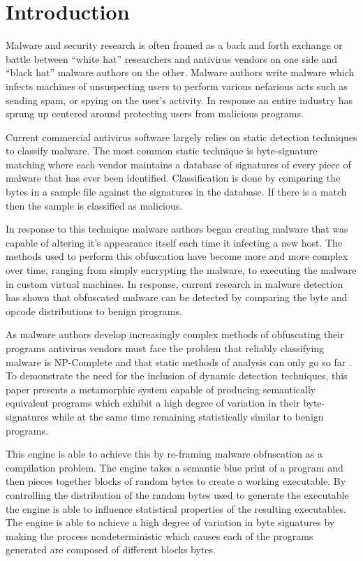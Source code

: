 \chapter{Introduction}

    Malware and security research is often framed as a back and forth exchange
    or battle between ``white hat'' researchers and antivirus vendors on one
    side and ``black hat'' malware authors on the other. Malware authors write
    malware which infects machines of unsuspecting users to perform various
    nefarious acts such as sending spam, or spying on the user's activity. In
    response an entire industry has sprung up centered around protecting users
    from malicious programs.

    Current commercial antivirus software largely relies on static detection
    techniques to classify malware. The most common static technique is
    byte-signature matching where each vendor maintains a database of signatures
    of every piece of malware that has ever been identified. Classification is
    done by comparing the bytes in a sample file against the signatures in the
    database. If there is a match then the sample is classified as malicious.

    In response to this technique malware authors began creating malware that
    was capable of altering it's appearance itself each time it infecting a new
    host. The methods used to perform this obfuscation have become more and more
    complex over time, ranging from simply encrypting the malware, to executing
    the malware in custom virtual machines. In response, current research in
    malware detection has shown that obfuscated malware can be detected by
    comparing the byte and opcode distributions to benign programs.

    As malware authors develop increasingly complex methods of obfuscating their
    programs antivirus vendors must face the problem that reliably classifying
    malware is NP-Complete and that static methods of analysis can only go so
    far \cite{npcomplete}. To demonstrate the need for the inclusion of dynamic
    detection techniques, this paper presents a metamorphic system capable of
    producing semantically equivalent programs which exhibit a high degree of
    variation in their byte-signatures while at the same time remaining
    statistically similar to benign programs.

    This engine is able to achieve this by re-framing malware obfuscation as a
    compilation problem. The engine takes a semantic blue print of a program and
    then pieces together blocks of random bytes to create a working executable.
    By controlling the distribution of the random bytes used to generate the
    executable the engine is able to influence statistical properties of the
    resulting executables. The engine is able to achieve a high degree of
    variation in byte signatures by making the process nondeterministic which
    causes each of the programs generated are composed of different blocks
    bytes.

